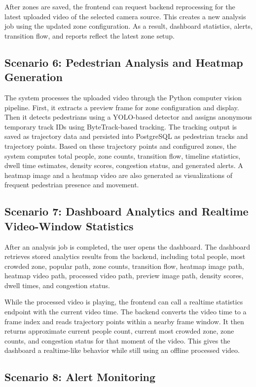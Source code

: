 \documentclass[12pt,a4paper]{report}
\begin{document}
After zones are saved, the frontend can request backend reprocessing for the latest uploaded video of the selected camera source.
This creates a new analysis job using the updated zone configuration.
As a result, dashboard statistics, alerts, transition flow, and reports reflect the latest zone setup.

\subsection*{Scenario 6: Pedestrian Analysis and Heatmap Generation}

The system processes the uploaded video through the Python computer vision pipeline.
First, it extracts a preview frame for zone configuration and display.
Then it detects pedestrians using a YOLO-based detector and assigns anonymous temporary track IDs using ByteTrack-based tracking.
The tracking output is saved as trajectory data and persisted into PostgreSQL as pedestrian tracks and trajectory points.
Based on these trajectory points and configured zones, the system computes total people, zone counts, transition flow, timeline statistics, dwell time estimates, density scores, congestion status, and generated alerts.
A heatmap image and a heatmap video are also generated as visualizations of frequent pedestrian presence and movement.

\subsection*{Scenario 7: Dashboard Analytics and Realtime Video-Window Statistics}

After an analysis job is completed, the user opens the dashboard.
The dashboard retrieves stored analytics results from the backend, including total people, most crowded zone, popular path, zone counts, transition flow, heatmap image path, heatmap video path, processed video path, preview image path, density scores, dwell times, and congestion status.

While the processed video is playing, the frontend can call a realtime statistics endpoint with the current video time.
The backend converts the video time to a frame index and reads trajectory points within a nearby frame window.
It then returns approximate current people count, current most crowded zone, zone counts, and congestion status for that moment of the video.
This gives the dashboard a realtime-like behavior while still using an offline processed video.

\subsection*{Scenario 8: Alert Monitoring}
\end{document}
